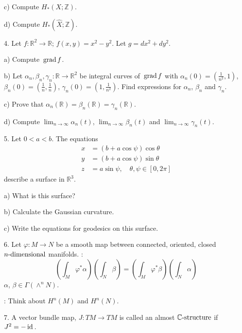 \documentclass[12pt]{article}
\def\R{{\mathbb R}}
\def\Z{{\mathbb Z}}
\def\C{{\mathbb C}}
\def\grad{{\hbox{\,grad\,}}}
\def\id{{\hbox{\,id\,}}}
\begin{document}
\begin{large}
\begin{description}
\item\quad c)
Compute $H_\ast(X;\Z)$.

\item \quad d)
Compute $H_\ast(\widehat X;\Z)$.

\item 4.
Let $f:\R^2\to\R$; $f(x,y)=x^2-y^2$. Let $g=dx^2+dy^2$.

\item\quad a)
Compute $\grad f$.

\item\quad b)
Let $\alpha_n, \beta_n, \gamma_n:\R\to\R^2$ be integral curves of $\grad f$
with $\alpha_n(0)=(\frac{1}{n^2},1)$, $\beta_n(0)=(\frac{1}{n},\frac{1}{n})$,
$\gamma_n(0)=(1,\frac{1}{n^2})$.
Find expressions for $\alpha_n$, $\beta_n$ and $\gamma_n$.

\item\quad c)
Prove that $\alpha_n(\R)=\beta_n(\R)=\gamma_n(\R)$.

\item\quad d)
Compute $\lim_{n\to\infty} \alpha_n(t)$, $\lim_{n\to\infty}\beta_n(t)$
and $\lim_{n\to\infty}\gamma_n(t)$.

\item 5.
Let $0<a<b$. The equations
$$\begin{aligned}
x&=(b+a\cos \psi)\cos \theta\\
y&=(b+a\cos \psi)\sin \theta\\
z&=a\sin \psi, \quad \theta,\psi\in[0,2\pi]
\end{aligned}$$
describe a surface in $\R^3$.

\item\quad a)
What is this surface?

\item\quad b)
Calculate the Gaussian curvature.

\item\quad c)
Write the equations for geodesics on this surface.

\item 6.
Let $\varphi:M\to N$ be a smooth map between connected, oriented, closed
$n\hbox{-dimensional}$ manifolds. :
$$ \left( \int_M \varphi^\ast\alpha \right) \left( \int_N\beta \right)
= \left( \int_M\varphi^\ast\beta \right) \left( \int_N\alpha \right)
$$
 $\alpha$, $\beta \in \Gamma(\wedge^n N)$.

: Think about $H^n(M)$ and $H^n(N)$.

\item 7.
A vector bundle map, $J:TM\to TM$ is called an almost $\C\hbox{-structure}$
if $J^2=-\id$.


\end{description}
\end{large}
\end{document}
